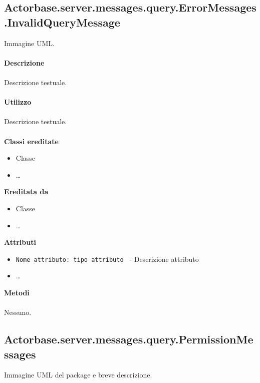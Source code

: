 \documentclass[a4paper]{article}
\begin{document}
	\subsection{Actorbase.server.messages.query.ErrorMessages.InvalidQueryMessage}
		Immagine UML.
		\\ \\
		\textbf{Descrizione}
			\\ \\
			Descrizione testuale.
			\\ \\
		\textbf{Utilizzo}
			\\ \\
			Descrizione testuale.
			\\ \\
		\textbf{Classi ereditate}
			\begin{itemize}
				\item Classe
				\item \dots
			\end{itemize}
		\textbf{Ereditata da}
			\begin{itemize}
				\item Classe
				\item \dots
			\end{itemize}
		\textbf{Attributi}
			\begin{itemize}
				\item \texttt{Nome attributo: tipo attributo } - Descrizione attributo
				\item \dots
			\end{itemize}
		\textbf{Metodi}
			\\ \\
			Nessuno.
			
	\subsection{Actorbase.server.messages.query.PermissionMessages}
		Immagine UML del package e breve descrizione.
		
\end{document}
